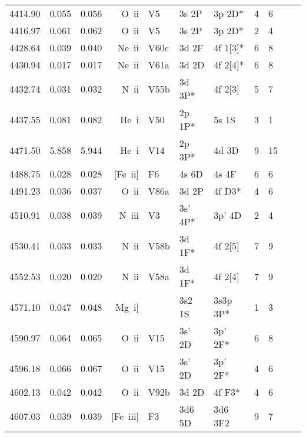 \begin{longtable}{lrlrlllllll}
 4414.90 &   0.055 &   0.056 &  O~{\sc ii}      &  V5        &  3s 2P     &  3p 2D*    &          4 &        6    \\
 4416.97 &   0.061 &   0.062 &  O~{\sc ii}      &  V5        &  3s 2P     &  3p 2D*    &          2 &        4    \\
 4428.64 &   0.039 &   0.040 &  Ne~{\sc ii}     &  V60c      &  3d 2F     &  4f 1[3]*  &          6 &        8    \\
 4430.94 &   0.017 &   0.017 &  Ne~{\sc ii}     &  V61a      &  3d 2D     &  4f 2[4]*  &          6 &        8    \\
 4432.74 &   0.031 &   0.032 &  N~{\sc ii}      &  V55b      &  3d 3P*    &  4f 2[3]   &          5 &        7    \\
 4437.55 &   0.081 &   0.082 &  He~{\sc i}      &  V50       &  2p 1P*    &  5s 1S     &          3 &        1    \\
 4471.50 &   5.858 &   5.944 &  He~{\sc i}      &  V14       &  2p 3P*    &  4d 3D     &          9 &       15    \\
 4488.75 &   0.028 &   0.028 &  [Fe~{\sc ii}]   &  F6        &  4s 6D     &  4s 4F     &          6 &        6    \\
 4491.23 &   0.036 &   0.037 &  O~{\sc ii}      &  V86a      &  3d 2P     &  4f D3*    &          4 &        6    \\
 4510.91 &   0.038 &   0.039 &  N~{\sc iii}     &  V3        &  3s' 4P*   &  3p' 4D    &          2 &        4    \\
 4530.41 &   0.033 &   0.033 &  N~{\sc ii}      &  V58b      &  3d 1F*    &  4f 2[5]   &          7 &        9    \\
 4552.53 &   0.020 &   0.020 &  N~{\sc ii}      &  V58a      &  3d 1F*    &  4f 2[4]   &          7 &        9    \\
 4571.10 &   0.047 &   0.048 &  Mg~{\sc i}]     &            &  3s2 1S    &  3s3p 3P*  &          1 &        3    \\
 4590.97 &   0.064 &   0.065 &  O~{\sc ii}      &  V15       &  3s' 2D    &  3p' 2F*   &          6 &        8    \\
 4596.18 &   0.066 &   0.067 &  O~{\sc ii}      &  V15       &  3s' 2D    &  3p' 2F*   &          4 &        6    \\
 4602.13 &   0.042 &   0.042 &  O~{\sc ii}      &  V92b      &  3d 2D     &  4f F3*    &          4 &        6    \\
 4607.03 &   0.039 &   0.039 &  [Fe~{\sc iii}]  &  F3        &  3d6 5D    &  3d6 3F2   &          9 &        7    \\

\end{longtable}

